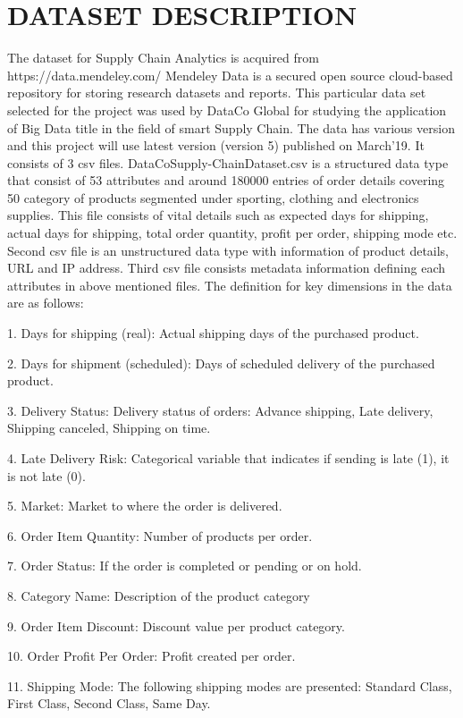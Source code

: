 \documentclass[journal,twoside,web]{ieeecolor}
\begin{document}
\section{DATASET DESCRIPTION}
The dataset for Supply Chain Analytics is acquired from https://data.mendeley.com/ Mendeley Data is a secured open source cloud-based repository for storing research datasets and reports. This particular data set selected for the project was used by DataCo Global for studying the application of Big Data title in the field of smart Supply Chain. The data has various version and this project will use latest version (version 5) published on March’19. It consists of 3 csv files. DataCoSupply-ChainDataset.csv is a structured data type that consist of 53 attributes and around 180000 entries of order details covering 50 category of products segmented under sporting, clothing and electronics supplies. This file consists of vital details such as expected days for shipping, actual days for shipping, total order quantity, profit per order, shipping mode etc. Second csv file is an unstructured data type with information of product details, URL and IP address. Third csv file consists metadata information defining each attributes in above mentioned files. The definition for key dimensions in the data are as follows:

1.	Days for shipping (real):  Actual shipping days of the purchased product.


2.	Days for shipment (scheduled): Days of scheduled delivery of the purchased product.


3.	Delivery Status: Delivery status of orders: Advance shipping, Late delivery, Shipping canceled, Shipping on time.


4.	Late Delivery Risk:  Categorical variable that indicates if sending is late (1), it is not late (0).


5.	Market:  Market to where the order is delivered.


6.	Order Item Quantity: Number of products per order.


7.	Order Status: If the order is completed or pending or on hold.


8.	Category Name: Description of the product category


9.	Order Item Discount: Discount value per product category.


10.	Order Profit Per Order: Profit created per order.


11.	Shipping Mode: The following shipping modes are presented: Standard Class, First Class, Second Class, Same Day.
\end{document}
